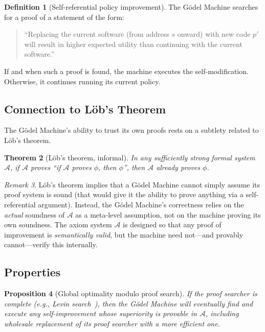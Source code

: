 \documentclass[11pt,a4paper]{article}
\newtheorem{theorem}{Theorem}[section]
\newtheorem{proposition}[theorem]{Proposition}
\theoremstyle{definition}
\newtheorem{definition}[theorem]{Definition}
\theoremstyle{remark}
\newtheorem{remark}[theorem]{Remark}
\begin{document}
\begin{definition}[Self-referential policy improvement]
The G\"odel Machine searches for a proof of a statement of the form:
\begin{quote}
``Replacing the current software (from address $s$ onward) with new code $p'$
will result in higher expected utility than continuing with the current
software.''
\end{quote}
If and when such a proof is found, the machine executes the self-modification.
Otherwise, it continues running its current policy.
\end{definition}

\subsection{Connection to L\"ob's Theorem}

The G\"odel Machine's ability to trust its own proofs rests on a subtlety
related to L\"ob's theorem.

\begin{theorem}[L\"ob's theorem, informal]
In any sufficiently strong formal system $\mathcal{A}$, if $\mathcal{A}$
proves ``if $\mathcal{A}$ proves $\phi$, then $\phi$'', then $\mathcal{A}$
already proves $\phi$.
\end{theorem}

\begin{remark}
L\"ob's theorem implies that a G\"odel Machine cannot simply assume its
proof system is sound (that would give it the ability to prove anything via
a self-referential argument).  Instead, the G\"odel Machine's correctness
relies on the \emph{actual} soundness of $\mathcal{A}$ as a meta-level
assumption, not on the machine proving its own soundness.  The axiom
system $\mathcal{A}$ is designed so that any proof of improvement is
\emph{semantically valid}, but the machine need not---and provably
cannot---verify this internally.
\end{remark}

\subsection{Properties}

\begin{proposition}[Global optimality modulo proof search]
If the proof searcher is complete (e.g., Levin search~\cite{Levin1973}),
then the G\"odel Machine will eventually find and execute any self-improvement
whose superiority is provable in $\mathcal{A}$, including wholesale
replacement of its proof searcher with a more efficient one.
\end{proposition}
\end{document}
